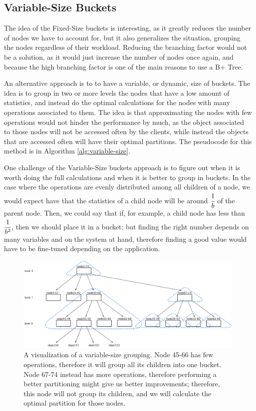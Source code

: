 \subsection{Variable-Size Buckets}\label{sec:Variable-Size buckets}
The idea of the Fixed-Size buckets is interesting, as it greatly reduces the number of nodes we have to account for, but it also generalizes the situation, grouping the nodes regardless of their workload. Reducing the branching factor would not be a solution, as it would just increase the number of nodes once again, and because the high branching factor is one of the main reasons to use a B+ Tree. 

An alternative approach is to to have a variable, or dynamic, size of buckets. The idea is to group in two or more levels the nodes that have a low amount of statistics, and instead do the optimal calculations for the nodes with many operations associated to them. The idea is that approximating the nodes with few operations would not hinder the performance by much, as the object associated to those nodes will not be accessed often by the clients, while instead the objects that are accessed often will have their optimal partitions. 
The pseudocode for this method is in Algorithm \ref{alg:variable-size}.


One challenge of the Variable-Size buckets approach is to figure out when it is worth doing the full calculations and when it is better to group in buckets. In the case where the operations are evenly distributed among all children of a node, we would expect have that the statistics of a child node will be around $\cfrac{1}{b}$ of the parent node. Then, we could say that if, for example, a child node has less than $\cfrac{1}{b^2}$, then we should place it in a bucket; but finding the right number depends on many variables and on the system at hand, therefore finding a good value would have to be fine-tuned depending on the application.

\begin{figure}[!htb]
  \centering
  \includegraphics[width=\textwidth,height=\textheight,keepaspectratio]{img/dynamic-buckets.png}
  \caption{ A visualization of a variable-size grouping. Node 45-66 has few operations, therefore it will group all its children into one bucket. Node 67-74 instead has more operations, therefore performing a better partitioning might give us better improvements; therefore, this node will not group its children, and we will calculate the optimal partition for those nodes. }
  \label{fig:Variable-Size-buckets}
\end{figure}

